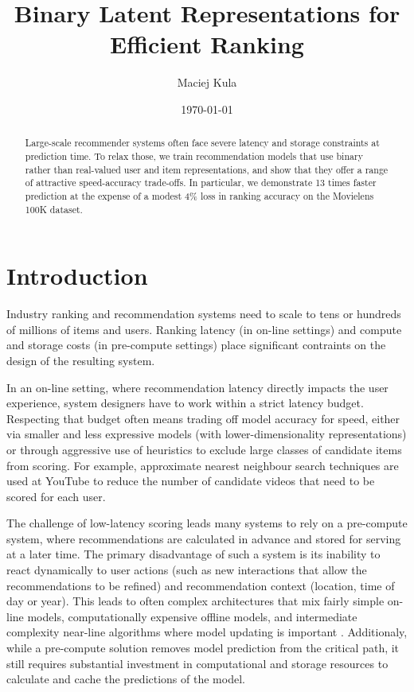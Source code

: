 \documentclass[sigchi]{acmart}
\begin{document}
\title{Binary Latent Representations for Efficient Ranking}
\author{Maciej Kula}
\date{\today}
\acmConference[]{}{}{}


\begin{abstract}
Large-scale recommender systems often face severe latency and storage constraints at prediction time. To relax those, we train recommendation models that use binary rather than real-valued user and item representations, and show that they offer a range of attractive speed-accuracy trade-offs. In particular, we demonstrate 13 times faster prediction at the expense of a modest 4\% loss in ranking accuracy on the Movielens 100K dataset.
\end{abstract}

\maketitle

\section{Introduction}
Industry ranking and recommendation systems need to scale to tens or hundreds of millions of items and users. Ranking latency (in on-line settings) and compute and storage costs (in pre-compute settings) place significant contraints on the design of the resulting system.

In an on-line setting, where recommendation latency directly impacts the user experience, system designers have to work within a strict latency budget. Respecting that budget often means trading off model accuracy for speed, either via smaller and less expressive models (with lower-dimensionality representations) or through aggressive use of heuristics to exclude large classes of candidate items from scoring. For example, approximate nearest neighbour search techniques are used at YouTube \citep{covington2016deep} to reduce the number of candidate videos that need to be scored for each user.

The challenge of low-latency scoring leads many systems to rely on a pre-compute system, where recommendations are calculated in advance and stored for serving at a later time. The primary disadvantage of such a system is its inability to react dynamically to user actions (such as new interactions that allow the recommendations to be refined) and recommendation context (location, time of day or year). This leads to often complex architectures that mix fairly simple on-line models, computationally expensive offline models, and intermediate complexity near-line algorithms where model updating is important \citep{amatriain2013big}. Additionaly, while a pre-compute solution removes model prediction from the critical path, it still requires substantial investment in computational and storage resources to calculate and cache the predictions of the model.
\end{document}
